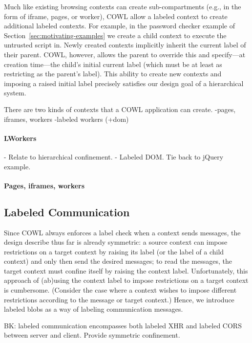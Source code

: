 Much like existing browsing contexts can create sub-compartments
(e.g., in the form of iframe, pages, or worker), COWL allow a labeled
context to create additional labeled contexts.
%
For example, in the password checker example of
Section~\ref{sec:motivating-examples} we create a child context to
execute the untrusted script in.
%
Newly created contexts implicitly inherit the current label of their
parent.
%
COWL, however, allows the parent to override this and specify---at
creation time---the child's initial current label (which must be at
least as restricting as the parent's label).
%
This ability to create new contexts and imposing a raised initial
label precisely satisfies our design goal of a hierarchical system.

There are two kinds of contexts that a COWL application can create.
%
-pages, iframes, workers
-labeled workers (+dom)

\paragraph{LWorkers}
- Relate to hierarchical confinement.
- Labeled DOM. Tie back to jQuery example.

\paragraph{Pages, iframes, workers}

\subsection{Labeled Communication}
\label{sec:system:communication}
Since COWL always enforces a label check when a context sends
messages, the design describe thus far is already symmetric: a source
context can impose restrictions on a target context by raising its
label (or the label of a child context) and only then send the desired
messages; to read the messages, the target context must confine itself
by raising the context label.
%
Unfortunately, this approach of (ab)using the context label to impose
restrictions on a target context is cumbersome.
%
(Consider the case where a context wishes to impose different
restrictions according to the message or target context.)
%
Hence, we introduce labeled blobs as a way of labeling communication
messages.


BK: labeled communication encompasses both labeled XHR and labeled
CORS between server and client. Provide symmetric confinement.

